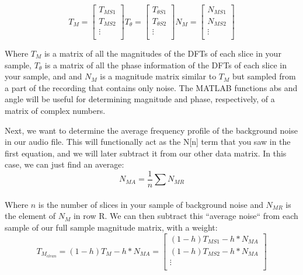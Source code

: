 \documentclass{tufte-handout}
\begin{document}
\begin{equation}\label{eq:sampled_audio}
    T_M=
\begin{bmatrix}
    T_{MS1}       \\
    T_{MS2}       \\
    \vdots \\
\end{bmatrix}
	T_\theta=
\begin{bmatrix}
    T_{\theta S1}       \\
    T_{\theta S2}       \\
    \vdots \\
\end{bmatrix}
	N_M=
\begin{bmatrix}
    N_{MS1}       \\
    N_{MS2}       \\
    \vdots \\
\end{bmatrix}
\end{equation}

Where $T_M$ is a matrix of all the magnitudes of the DFTs of each slice in your sample, $T_\theta$ is a matrix of all the phase information of the DFTs of each slice in your sample, and and $N_M$ is a magnitude matrix similar to $T_M$ but sampled from a part of the recording that contains only noise. The MATLAB functions abs and angle will be useful for determining magnitude and phase, respectively, of a matrix of complex numbers.

Next, we want to determine the average frequency profile of the background noise in our audio file. This will functionally act as the N[n] term that you saw in the first equation, and we will later subtract it from our other data matrix. In this case, we can just find an average:
\begin{equation}
	N_{MA} = \frac{1}{n}\sum_{}^{} N_{MR}
\end{equation}

Where $n$ is the number of slices in your sample of background noise and $N_{MR}$ is the element of $N_M$ in row R. We can then subtract this ``average noise`` from each sample of our full sample magnitude matrix, with a weight:
\begin{equation}
	T_{M_{clean}} = (1-h)T_M - h*N_{MA} = 
	\begin{bmatrix}
    (1-h)T_{MS1} - h*N_{MA}       \\
    (1-h)T_{MS2} - h*N_{MA}       \\
    \vdots \\
\end{bmatrix}
\end{equation}
\end{document}
